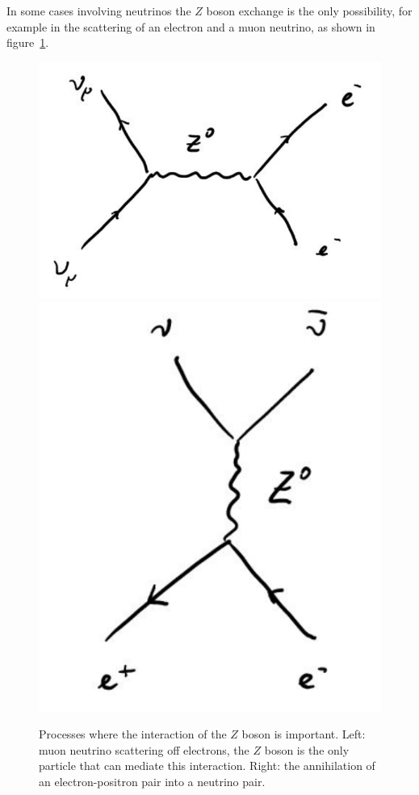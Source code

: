 \documentclass[12pt]{article}
\begin{document}
In some cases involving neutrinos the $Z$ boson exchange is the only possibility, for example in the scattering of an electron and a muon neutrino, as shown in figure~\ref{fig:Zprocesses}.
\begin{figure}
\begin{center}
\includegraphics[scale=0.3]{images/enumuenumu.png}
\includegraphics[scale=0.3]{images/eeZnunu.png}
\end{center}
\caption{Processes where the interaction of the $Z$ boson is important. Left: muon neutrino scattering off electrons, the $Z$ boson is the only particle that can mediate this interaction. Right: the annihilation of an electron-positron pair into a neutrino pair.}\label{fig:Zprocesses}
\end{figure}
\end{document}
